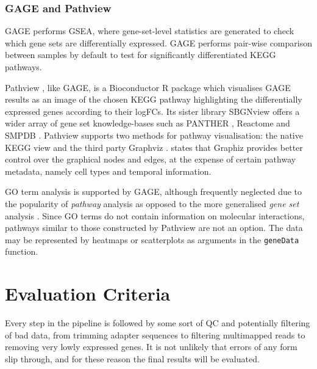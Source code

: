 \subsubsection{GAGE and Pathview}
GAGE \citep{luo2009gage} performs \ac{GSEA}, where gene-set-level statistics are generated to check which gene sets are differentially expressed. %
GAGE performs pair-wise comparison between samples by default to test for significantly differentiated KEGG pathways. 

Pathview \citep{luo2013pathview}, like GAGE, is a Bioconductor \citep{gentleman2004bioconductor} R package which visualises GAGE results as an image of the chosen KEGG pathway highlighting the differentially expressed genes according to their \ac{logFC}s. Its sister library SBGNview \citep{dong2022sbgnview} offers a wider array of gene set knowledge-bases such as PANTHER \citep{mi2005panther}, Reactome \citep{croft2010reactome} and SMPDB \citep{frolkis2010smpdb}. Pathview supports two methods for pathway visualisation: the native KEGG view and the third party Graphviz \citep{ellson2001graphviz}. \cite{luo2013pathview} states that Graphiz provides better control over the graphical nodes and edges, at the expense of certain pathway metadata, namely cell types and temporal information.

\ac{GO} term analysis is supported by GAGE, although frequently neglected due to the popularity of \textit{pathway} analysis as opposed to the more generalised \textit{gene set} analysis \citep{luo2009gage}. Since \ac{GO} terms do not contain information on molecular interactions, pathways similar to those constructed by Pathview are not an option. The data may be represented by heatmaps or scatterplots as arguments in the \texttt{geneData} function.



\section{Evaluation Criteria}
Every step in the pipeline is followed by some sort of QC and potentially filtering of bad data, from trimming adapter sequences to filtering multimapped reads to removing very lowly expressed genes. It is not unlikely that errors of any form slip through, and for these reason the final results will be evaluated.

